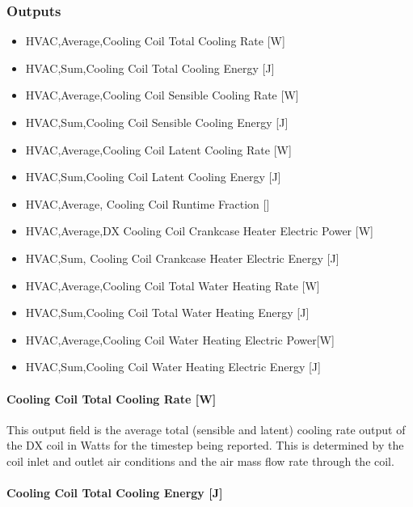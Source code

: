 \subsubsection{Outputs}\label{outputs-23}

\begin{itemize}
\item
  HVAC,Average,Cooling Coil Total Cooling Rate {[}W{]}
\item
  HVAC,Sum,Cooling Coil Total Cooling Energy {[}J{]}
\item
  HVAC,Average,Cooling Coil Sensible Cooling Rate {[}W{]}
\item
  HVAC,Sum,Cooling Coil Sensible Cooling Energy {[}J{]}
\item
  HVAC,Average,Cooling Coil Latent Cooling Rate {[}W{]}
\item
  HVAC,Sum,Cooling Coil Latent Cooling Energy {[}J{]}
\item
  HVAC,Average, Cooling Coil Runtime Fraction {[]}
\item
  HVAC,Average,DX Cooling Coil Crankcase Heater Electric Power {[}W{]}
\item
  HVAC,Sum, Cooling Coil Crankcase Heater Electric Energy {[}J{]}
\item
  HVAC,Average,Cooling Coil Total Water Heating Rate {[}W{]}
\item
  HVAC,Sum,Cooling Coil Total Water Heating Energy {[}J{]}
\item
  HVAC,Average,Cooling Coil Water Heating Electric Power{[}W{]}
\item
  HVAC,Sum,Cooling Coil Water Heating Electric Energy {[}J{]}
\end{itemize}

\paragraph{Cooling Coil Total Cooling Rate {[}W{]}}\label{cooling-coil-total-cooling-rate-w-6}

This output field is the average total (sensible and latent) cooling rate output of the DX coil in Watts for the timestep being reported. This is determined by the coil inlet and outlet air conditions and the air mass flow rate through the coil.

\paragraph{Cooling Coil Total Cooling Energy {[}J{]}}\label{cooling-coil-total-cooling-energy-j-6}

